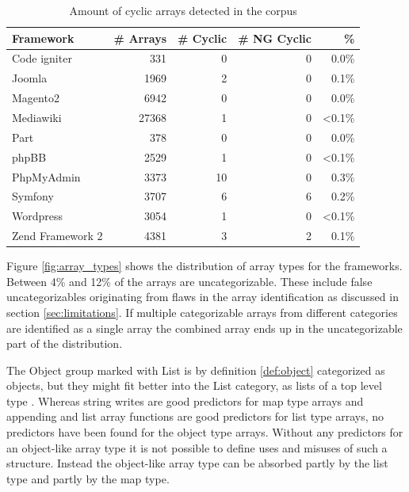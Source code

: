 \begin{table}[htbp]
\begin{center}
\begin{tabular}{l| r  r  r  r}
Framework & \# Arrays & \# Cyclic & \# NG Cyclic & \%  \\ \hline \hline
Code igniter & 331 & 0 & 0 & 0.0\% \\
Joomla & 1969 & 2 & 0 & 0.1\% \\ 
Magento2 & 6942 & 0 & 0 & 0.0\%\\ 
Mediawiki & 27368 & 1 & 0 & <0.1\%\\ 
Part & 378 & 0 & 0 & 0.0\%\\ 
phpBB & 2529 & 1 & 0 & <0.1\%\\
PhpMyAdmin & 3373 & 10 & 0 & 0.3\%\\
Symfony & 3707 & 6 & 6 & 0.2\%\\ %
Wordpress & 3054 & 1 & 0 & <0.1\%\\ 
Zend Framework 2 & 4381 & 3 & 2 & 0.1\%
\end{tabular}
\end{center}
\caption{Amount of cyclic arrays detected in the corpus}
\label{tab:cyclic_arrays}
\end{table}

Figure \ref{fig:array_types} shows the distribution of array types for the frameworks.  Between 4\% and 12\% of the arrays are uncategorizable. These include false uncategorizables originating from flaws in the array identification as discussed in section \ref{sec:limitations}. If multiple categorizable arrays from different categories are identified as a single array the combined array ends up in the uncategorizable part of the distribution.

The Object group marked with List is by definition \ref{def:object} categorized as objects, but they might fit better into the List category, as lists of a top level type . Whereas string writes are good predictors for map type arrays and appending and list array functions are good predictors for list type arrays, no predictors have been found for the object type arrays. Without any predictors for an object-like array type it is not possible to define uses and misuses of such a structure. Instead the object-like array type can be absorbed partly by the list type and partly by the map type. 


